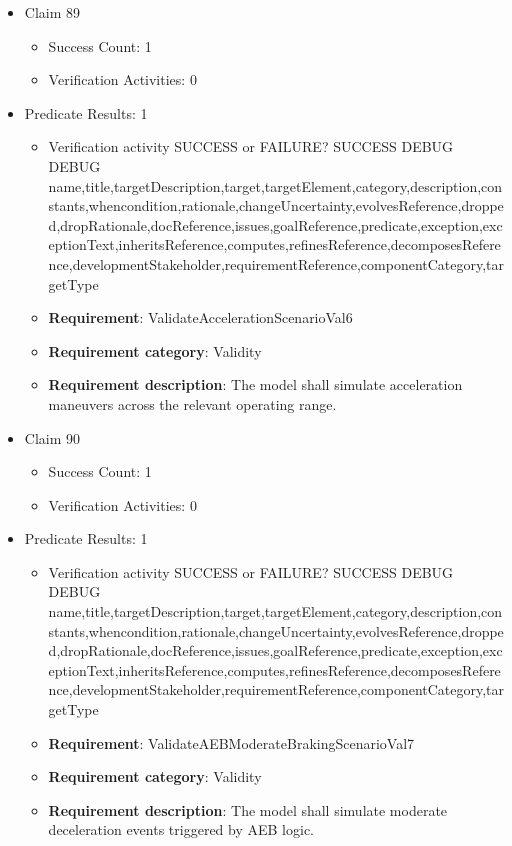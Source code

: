 \documentclass{article}
\begin{document}
\begin{itemize}
  				  \item Claim 89
				\begin{itemize}
			    	\item Success Count: 1 
			    	\item Verification Activities: 0
				\end{itemize}
				
									    
				\item Predicate Results: 1
					\begin{itemize}				
					\item Verification activity SUCCESS or FAILURE? SUCCESS
					DEBUG DEBUG name,title,targetDescription,target,targetElement,category,description,constants,whencondition,rationale,changeUncertainty,evolvesReference,dropped,dropRationale,docReference,issues,goalReference,predicate,exception,exceptionText,inheritsReference,computes,refinesReference,decomposesReference,developmentStakeholder,requirementReference,componentCategory,targetType
					\item \textbf{Requirement}: ValidateAccelerationScenarioVal6 
					\item \textbf{Requirement category}: Validity
					\item \textbf{Requirement description}: The model shall simulate acceleration maneuvers across the relevant operating range.
					\end{itemize}

  				  \item Claim 90
				\begin{itemize}
			    	\item Success Count: 1 
			    	\item Verification Activities: 0
				\end{itemize}
				
									    
				\item Predicate Results: 1
					\begin{itemize}				
					\item Verification activity SUCCESS or FAILURE? SUCCESS
					DEBUG DEBUG name,title,targetDescription,target,targetElement,category,description,constants,whencondition,rationale,changeUncertainty,evolvesReference,dropped,dropRationale,docReference,issues,goalReference,predicate,exception,exceptionText,inheritsReference,computes,refinesReference,decomposesReference,developmentStakeholder,requirementReference,componentCategory,targetType
					\item \textbf{Requirement}: ValidateAEBModerateBrakingScenarioVal7 
					\item \textbf{Requirement category}: Validity
					\item \textbf{Requirement description}: The model shall simulate moderate deceleration events triggered by AEB logic.
					\end{itemize}


\end{itemize}
\end{document}
